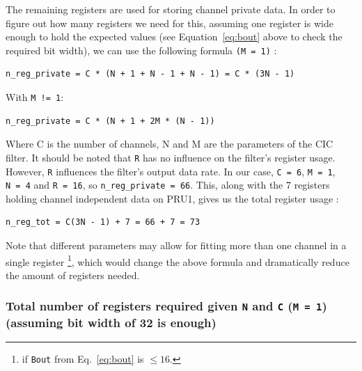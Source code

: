 \documentclass[]{report}
\begin{document}
The remaining registers are used for storing channel private data. In order to figure out how many registers we need for this, assuming one register is wide enough to hold the expected values (see Equation~\ref{eq:bout} above to check the required bit width), we can use the following formula \texttt{(M = 1)} :

\begin{verbatim}
n_reg_private = C * (N + 1 + N - 1 + N - 1) = C * (3N - 1)
\end{verbatim}

With \texttt{M\ !=\ 1}:

\begin{verbatim}
n_reg_private = C * (N + 1 + 2M * (N - 1))
\end{verbatim}

Where C is the number of channels, N and M are the parameters of the CIC
filter. It should be noted that \texttt{R} has no influence on the
filter's register usage. However, \texttt{R} influences the filter's
output data rate. In our case, \texttt{C\ =\ 6}, \texttt{M\ =\ 1},
\texttt{N\ =\ 4} and \texttt{R\ =\ 16}, so
\texttt{n\_reg\_private\ =\ 66}. This, along with the 7 registers holding channel independent data on
PRU1, gives us the total register usage :

\begin{verbatim}
n_reg_tot = C(3N - 1) + 7 = 66 + 7 = 73
\end{verbatim}

Note that different parameters may allow for fitting more than one
channel in a single register \footnote{if \texttt{B\textunderscore out} from Eq.~\ref{eq:bout} is $ \leq 16 $.}, which would change the above formula and
dramatically reduce the amount of registers needed.




\hypertarget{total-number-of-registers-required-given-n-and-c-m-1-assuming-bit-width-of-32-is-enough}{%
\subsubsection{\texorpdfstring{Total number of registers required given
\texttt{N} and \texttt{C} (\texttt{M\ =\ 1}) (assuming bit width of 32
is
enough)}{Total number of registers required given N and C (M = 1) (assuming bit width of 32 is enough)}}\label{total-number-of-registers-required-given-n-and-c-m-1-assuming-bit-width-of-32-is-enough}}
\end{document}
